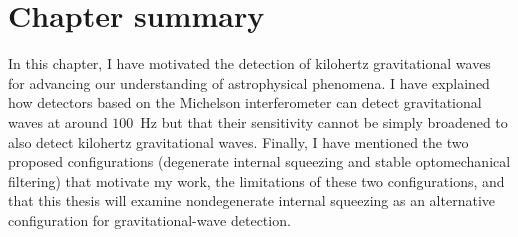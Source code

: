 

\section{Chapter summary}


In this chapter, I have motivated the detection of kilohertz gravitational waves for advancing our understanding of astrophysical phenomena. I have explained how detectors based on the Michelson interferometer can detect gravitational waves at around $100$~Hz but that their sensitivity cannot be simply broadened to also detect kilohertz gravitational waves. Finally, I have mentioned the two proposed configurations (degenerate internal squeezing and stable optomechanical filtering) that motivate my work, the limitations of these two configurations, and that this thesis will examine nondegenerate internal squeezing as an alternative configuration for gravitational-wave detection.



